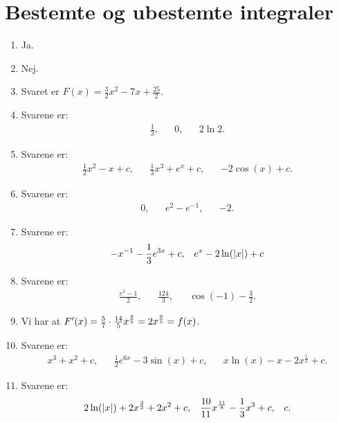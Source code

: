 \section{Bestemte og ubestemte integraler}

\begin{enumerate}
	\item Ja.
	
	
	\item Nej.
	
	\item Svaret er $F(x)=\frac{3}{2}x^2-7x+\frac{25}{2}$.
	
	\item Svarene er:
	\begin{align*}
	\frac{1}{3},&& 0, && 2\ln 2. 
	\end{align*}
		
	
	\item Svarene er:
	\begin{align*}
	\frac{1}{2}x^2-x+c, && \frac{1}{3}x^3+e^x+c,&& -2\cos(x)+c.
	\end{align*}
	
	\item Svarene er:
	\begin{align*}
	0,&& e^2-e^{-1}, && -2.
	\end{align*}
	
	\item Svarene er:
	\begin{align*}
	-x^{-1}-\frac{1}{3}e^{3x}+c ,&& e^{x}-2\ln(\vert x\vert)+c
	\end{align*}
	
	
	\item Svarene er:
	\begin{align*}
	\frac{e^2-1}{2},&&   \frac{124}{3},&& \cos(-1)-\frac{3}{2}.
	\end{align*}
	
	
	
	
	
	\item Vi har at $F'(x)=\frac{5}{7}\cdot\frac{14}{5}x^{\frac{9}{5}}=2x^{\frac{9}{5}}=f(x)$.
	
	\item Svarene er:
	\begin{align*}
	x^3+x^2+c,&& \frac{1}{2}e^{6x}-3\sin(x)+c,&& x\ln(x)-x-2x^{\frac{1}{2}}+c.
	\end{align*}
	

	
	\item Svarene er:
	\begin{align*}
	2\ln(\vert x\vert)+2x^{\frac{3}{2}}+2x^2+c,&& \frac{10}{11}x^{\frac{11}{8}}-\frac{1}{3}x^3+c,&& c.
	\end{align*}
	

\end{enumerate}
